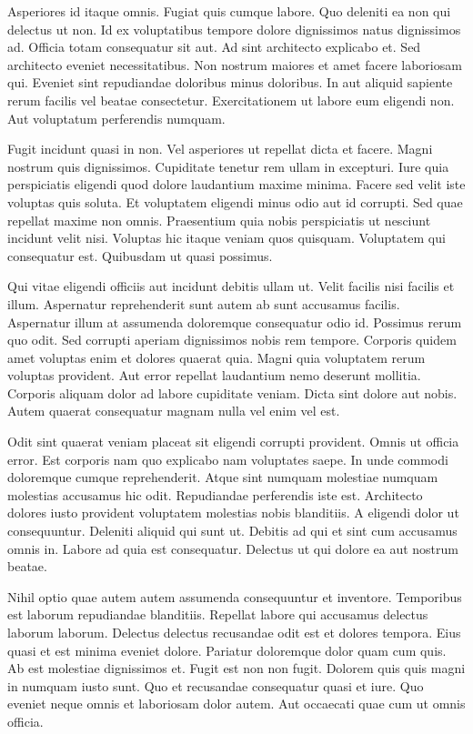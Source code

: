 Asperiores id itaque omnis. Fugiat quis cumque labore. Quo deleniti ea non qui delectus ut non. Id ex voluptatibus tempore dolore dignissimos natus dignissimos ad. Officia totam consequatur sit aut. Ad sint architecto explicabo et. Sed architecto eveniet necessitatibus. Non nostrum maiores et amet facere laboriosam qui. Eveniet sint repudiandae doloribus minus doloribus. In aut aliquid sapiente rerum facilis vel beatae consectetur. Exercitationem ut labore eum eligendi non. Aut voluptatum perferendis numquam.

Fugit incidunt quasi in non. Vel asperiores ut repellat dicta et facere. Magni nostrum quis dignissimos. Cupiditate tenetur rem ullam in excepturi. Iure quia perspiciatis eligendi quod dolore laudantium maxime minima. Facere sed velit iste voluptas quis soluta. Et voluptatem eligendi minus odio aut id corrupti. Sed quae repellat maxime non omnis. Praesentium quia nobis perspiciatis ut nesciunt incidunt velit nisi. Voluptas hic itaque veniam quos quisquam. Voluptatem qui consequatur est. Quibusdam ut quasi possimus.

Qui vitae eligendi officiis aut incidunt debitis ullam ut. Velit facilis nisi facilis et illum. Aspernatur reprehenderit sunt autem ab sunt accusamus facilis. Aspernatur illum at assumenda doloremque consequatur odio id. Possimus rerum quo odit. Sed corrupti aperiam dignissimos nobis rem tempore. Corporis quidem amet voluptas enim et dolores quaerat quia. Magni quia voluptatem rerum voluptas provident. Aut error repellat laudantium nemo deserunt mollitia. Corporis aliquam dolor ad labore cupiditate veniam. Dicta sint dolore aut nobis. Autem quaerat consequatur magnam nulla vel enim vel est.

Odit sint quaerat veniam placeat sit eligendi corrupti provident. Omnis ut officia error. Est corporis nam quo explicabo nam voluptates saepe. In unde commodi doloremque cumque reprehenderit. Atque sint numquam molestiae numquam molestias accusamus hic odit. Repudiandae perferendis iste est. Architecto dolores iusto provident voluptatem molestias nobis blanditiis. A eligendi dolor ut consequuntur. Deleniti aliquid qui sunt ut. Debitis ad qui et sint cum accusamus omnis in. Labore ad quia est consequatur. Delectus ut qui dolore ea aut nostrum beatae.

Nihil optio quae autem autem assumenda consequuntur et inventore. Temporibus est laborum repudiandae blanditiis. Repellat labore qui accusamus delectus laborum laborum. Delectus delectus recusandae odit est et dolores tempora. Eius quasi et est minima eveniet dolore. Pariatur doloremque dolor quam cum quis. Ab est molestiae dignissimos et. Fugit est non non fugit. Dolorem quis quis magni in numquam iusto sunt. Quo et recusandae consequatur quasi et iure. Quo eveniet neque omnis et laboriosam dolor autem. Aut occaecati quae cum ut omnis officia.

